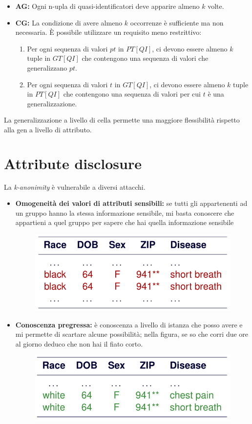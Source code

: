 \documentclass{report}
\begin{document}
\begin{itemize}
    \item \textbf{AG:} Ogni n-upla di quasi-identificatori deve apparire almeno $k$ volte.
    \item \textbf{CG:} La condizione di avere almeno $k$ occorrenze è sufficiente ma non necessaria. È possibile utilizzare un requisito meno restrittivo:
    \begin{enumerate}
        \item Per ogni sequenza di valori $pt$ in $\mathit{PT[QI]}$, ci devono essere almeno $k$ tuple in $\mathit{GT[QI]}$ che contengono una sequenza di valori che generalizzano $pt$.
        \item Per ogni sequenza di valori $t$ in $\mathit{GT[QI]}$, ci devono essere almeno $k$ tuple in $\mathit{PT[QI]}$ che contengono una sequenza di valori per cui $t$ è una generalizzazione.
    \end{enumerate}
\end{itemize}

\noindent La generalizzazione a livello di cella permette una maggiore flessibilità rispetto alla gen a livello di attributo.

\section{Attribute disclosure}

La \textit{k-anonimity} è vulnerabile a diversi attacchi.
\begin{itemize}
    \item \textbf{Omogeneità dei valori di attributi sensibili:} se tutti gli appartenenti ad un gruppo
    hanno la stessa informazione sensibile, mi basta conoscere che appartieni a quel gruppo per sapere che hai quella informazione sensibile
    \begin{figure}[ht]
        \centering
        \includegraphics[width=0.5\linewidth]{images/omogen.png}
    \end{figure}
    \item \textbf{Conoscenza pregressa:} è conoscenza a livello di istanza che posso avere e mi permette di scartare alcune possibilità; nella figura, se
    so che corri due ore al giorno deduco che non hai il fiato corto.
    \begin{figure}[ht]
        \centering
        \includegraphics[width=0.5\linewidth]{images/back.know.png}
    \end{figure}
\end{itemize}
\end{document}
